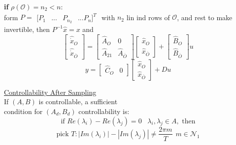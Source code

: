 \documentclass[twocolumn]{article}    %
\begin{document}
        \noindent
        \textbf{if} \(\rho(\mathcal{O}) =n_2<n\):\\
        form \(P = \begin{matrix}
            [P_1 & ... & P_{n_2} & ... P_n]^T
        \end{matrix}\) with \(n_2\) lin ind rows of \(\mathcal{O}\), and rest to make invertible, then \(P^{-1} \hat{x} = x\) and 
        \begin{equation*}
            \begin{bmatrix}
                \hat{\Dot{x}}_O \\ \hat{\Dot{x}}_{\overline{O} }
            \end{bmatrix} = \begin{bmatrix}
                \hat{A}_O & 0 \\ 
                \hat{A}_{21} & \hat{A}_{\overline{O}}
            \end{bmatrix} \begin{bmatrix}
                \hat{x}_O \\ \hat{x}_{\overline{O}}
            \end{bmatrix} + \begin{bmatrix}
                \hat{B}_O \\ \hat{B}_{\overline{O}}
            \end{bmatrix} u
        \end{equation*}
        \begin{equation*}
            y = \begin{bmatrix}
                \hat{C}_O & 0
            \end{bmatrix} \begin{bmatrix}
                \hat{x}_O \\ \hat{x}_{\overline{O}}
            \end{bmatrix} + Du
        \end{equation*}
    
   
    
\noindent
\underline{Controllability After Sampling}\\
If \((A,B)\) is controllable, a sufficient\\ 
condition for \((A_d, B_d)\) controllability is:
\begin{equation*}
    \text{if } Re(\lambda_i) - Re(\lambda_j) = 0 \hspace{10pt} \lambda_i , \lambda_j \in A, \text{ then}
\end{equation*}
\begin{equation*}
    \text{pick } T: |Im(\lambda_i)| - |Im(\lambda_j)| \neq \frac{2\pi m}{T} \hspace{5pt} m \in \mathcal{N}_1
\end{equation*}
\end{document}
